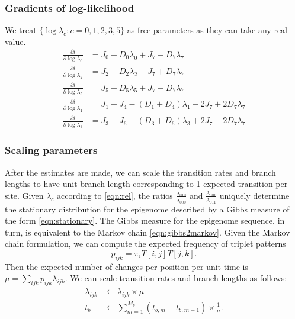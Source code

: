 \documentclass[11pt]{article}
\begin{document}
\subsubsection{Gradients of log-likelihood}
We treat $\{\log\lambda_c: c = 0,1,2,3,5\}$ as free parameters as they can take any real value.
\begin{equation}
\begin{aligned}
\frac{\partial l}{\partial \log\lambda_0} &= J_0 - D_0\lambda_0 + J_7 - D_7\lambda_7\\
\frac{\partial l}{\partial \log\lambda_2} &= J_2 - D_2\lambda_2 - J_7 + D_7\lambda_7 \\
\frac{\partial l}{\partial \log\lambda_5} &= J_5 - D_5\lambda_5 + J_7 - D_7\lambda_7\\
\frac{\partial l}{\partial \log\lambda_1} &= J_1 + J_4 - (D_1 + D_4)\lambda_1 - 2J_7 + 2D_7\lambda_7\\
\frac{\partial l}{\partial \log\lambda_3} &= J_3 + J_6 - (D_3 + D_6)\lambda_3 + 2J_7 - 2D_7\lambda_7
\end{aligned}
\end{equation}

\subsubsection{Scaling parameters}
After the estimates are made, we can scale the transition rates and
branch lengths to have unit branch length corresponding to 1 expected
transition per site.  Given $\lambda_{c}$ according to
\eqref{eqn:rel}, the ratios $\frac{\lambda_{010}}{\lambda_{000}}$ and
$\frac{\lambda_{001}}{\lambda_{011}}$ uniquely determine the
stationary distribution for the epigenome described by a Gibbs measure
of the form \eqref{eqn:stationary}. The Gibbs measure for the
epigenome sequence, in turn, is equivalent to the Markov chain
\eqref{eqn:gibbs2markov}. Given the Markov chain formulation, we can
compute the expected frequency of triplet patterns
\[
p_{ijk} = \pi_i T[i,j] T[j,k].
\] 
Then the expected number of changes per position per
unit time is $\mu = \sum_{ijk}p_{ijk}\lambda_{ijk}$. We can scale transition
rates and branch lengths as follows:
\begin{equation}\label{eqn:tidentifiable}
\begin{aligned}
\lambda_{ijk} &\leftarrow \lambda_{ijk}\times \mu \\
t_b &\leftarrow \sum\limits_{m=1}^{M_b} (t_{b,m} - t_{b,m-1}) \times \frac{1}{\mu}.
\end{aligned}
\end{equation}
\end{document}
